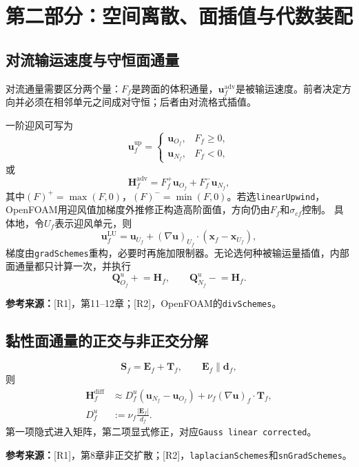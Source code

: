 \documentclass[UTF8,12pt,a4paper]{ctexart}
\numberwithin{equation}{section}
\newcommand{\Rone}{\textnormal{[R1]}}
\newcommand{\Rtwo}{\textnormal{[R2]}}
\newcommand{\source}[1]{\par\smallskip\noindent\colorbox{sourcebg}{%
  \parbox{0.955\linewidth}{\footnotesize\color{sourcegray}\textbf{参考来源：}#1}}\par\smallskip}
\begin{document}
\section{第二部分：空间离散、面插值与代数装配}
\subsection{对流输运速度与守恒面通量}
对流通量需要区分两个量：$F_f$是跨面的体积通量，$\bm u_f^{\mathrm{adv}}$是被输运速度。前者决定方向并必须在相邻单元之间成对守恒；后者由对流格式插值。

一阶迎风可写为
\begin{equation}
  \bm u_f^{\mathrm{up}}=
  \begin{cases}
    \bm u_{O_f},&F_f\ge0,\\
    \bm u_{N_f},&F_f<0,
  \end{cases}
\end{equation}
或
\begin{equation}
  \boxed{\bm H_f^{\mathrm{adv}}
  =F_f^+\bm u_{O_f}+F_f^-\bm u_{N_f},}
  \label{eq:upwind_momentum_flux}
\end{equation}
其中$(F)^+=\max(F,0)$，$(F)^-=\min(F,0)$。若选\texttt{linearUpwind}，OpenFOAM用迎风值加梯度外推修正构造高阶面值，方向仍由$F_f$和$\sigma_{cf}$控制。
具体地，令$U_f$表示迎风单元，则
\begin{equation}
  \bm u_f^{\mathrm{LU}}
  =\bm u_{U_f}+(\nabla\bm u)_{U_f}\cdot(\bm x_f-\bm x_{U_f}),
\end{equation}
梯度由\texttt{gradSchemes}重构，必要时再施加限制器。无论选何种被输运量插值，内部面通量都只计算一次，并执行
\begin{equation}
  \bm Q_{O_f}^u\mathrel{+}=\bm H_f,
  \qquad
  \bm Q_{N_f}^u\mathrel{-}=\bm H_f.
\end{equation}
\source{\Rone，第11--12章；\Rtwo，OpenFOAM的\texttt{divSchemes}。}

\subsection{黏性面通量的正交与非正交分解}
\begin{equation}
  \bm S_f=\bm E_f+\bm T_f,\qquad \bm E_f\parallel\bm d_f,
  \label{eq:nonorth_decomp}
\end{equation}
则
\begin{align}
  \bm H_f^{\mathrm{diff}}
  &\approx D_f^u(\bm u_{N_f}-\bm u_{O_f})
  +\nu_f(\nabla\bm u)_f\cdot\bm T_f,
  \label{eq:diff_flux_nonorth}\\
  D_f^u&:=\nu_f\frac{|\bm E_f|}{d_f}.
\end{align}
第一项隐式进入矩阵，第二项显式修正，对应\texttt{Gauss linear corrected}。
\source{\Rone，第8章非正交扩散；\Rtwo，\texttt{laplacianSchemes}和\texttt{snGradSchemes}。}
\end{document}
